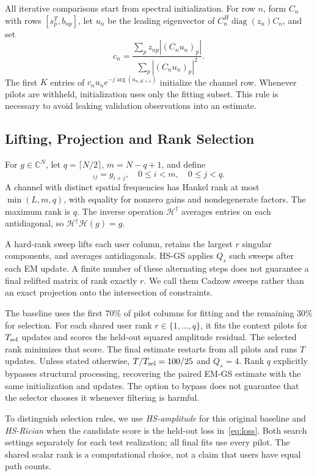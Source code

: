 \documentclass[10pt,journal,letterpaper]{IEEEtran}
\newcommand{\HH}{\mathcal{H}}
\DeclareMathOperator{\diag}{diag}
\begin{document}
All iterative comparisons start from spectral initialization. For row $n$, form $C_n$ with rows $[s_p^T,b_{np}]$, let $u_n$ be the leading eigenvector of $C_n^H\diag(z_n)C_n$, and set
\begin{equation}
 c_n=\frac{\sum_p z_{np}|(C_nu_n)_p|}{\sum_p|(C_nu_n)_p|^2}.
\end{equation}
The first $K$ entries of $c_nu_ne^{-j\arg(u_{n,K+1})}$ initialize the channel row. Whenever pilots are withheld, initialization uses only the fitting subset. This rule is necessary to avoid leaking validation observations into an estimate.

\subsection{Lifting, Projection and Rank Selection}
For $g\in\mathbb C^N$, let $q=\lceil N/2\rceil$, $m=N-q+1$, and define
\begin{equation}
 [\HH(g)]_{ij}=g_{i+j},\quad 0\le i<m,\quad0\le j<q.
\end{equation}
A channel with distinct spatial frequencies has Hankel rank at most $\min(L,m,q)$, with equality for nonzero gains and nondegenerate factors. The maximum rank is $q$. The inverse operation $\HH^\dagger$ averages entries on each antidiagonal, so $\HH^\dagger\HH(g)=g$.

A hard-rank sweep lifts each user column, retains the largest $r$ singular components, and averages antidiagonals. HS-GS applies $Q_s$ such sweeps after each EM update. A finite number of these alternating steps does not guarantee a final relifted matrix of rank exactly $r$. We call them Cadzow sweeps rather than an exact projection onto the intersection of constraints.

The baseline uses the first 70\% of pilot columns for fitting and the remaining 30\% for selection. For each shared user rank $r\in\{1,\ldots,q\}$, it fits the context pilots for $T_{\rm sel}$ updates and scores the held-out squared amplitude residual. The selected rank minimizes that score. The final estimate restarts from all pilots and runs $T$ updates. Unless stated otherwise, $T/T_{\rm sel}=100/25$ and $Q_s=4$. Rank $q$ explicitly bypasses structural processing, recovering the paired EM-GS estimate with the same initialization and updates. The option to bypass does not guarantee that the selector chooses it whenever filtering is harmful.

To distinguish selection rules, we use \emph{HS-amplitude} for this original baseline and \emph{HS-Rician} when the candidate score is the held-out loss in~\eqref{eq:loss}. Both search settings separately for each test realization; all final fits use every pilot. The shared scalar rank is a computational choice, not a claim that users have equal path counts.
\end{document}

